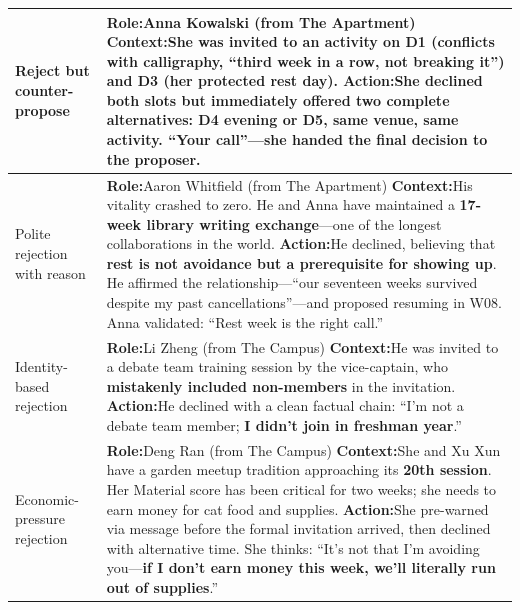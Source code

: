 \begin{table}[t]
\begin{tabular}{p{0.8in}p{4.3in}}
  Reject but \newline counter-\newline propose
  &
  \textbf{Role:}\quad Anna Kowalski \hfill (from The Apartment) \newline
  \textbf{Context:}\quad She was invited to an activity on D1 (conflicts with calligraphy, ``third week in a row, not breaking it'') and D3 (her protected rest day). \newline
  \textbf{Action:}\quad She declined both slots but \textbf{immediately offered two complete alternatives}: D4 evening or D5, same venue, same activity. ``Your call''---she handed the final decision to the proposer.
  \\
  \midrule
  
  Polite \newline rejection \newline with reason
  &
  \textbf{Role:}\quad Aaron Whitfield \hfill (from The Apartment) \newline
  \textbf{Context:}\quad His vitality crashed to zero. He and Anna have maintained a \textbf{17-week library writing exchange}---one of the longest collaborations in the world. \newline
  \textbf{Action:}\quad He declined, believing that \textbf{rest is not avoidance but a prerequisite for showing up}. He affirmed the relationship---``our seventeen weeks survived despite my past cancellations''---and proposed resuming in W08. Anna validated: ``Rest week is the right call.''
  \\
  \midrule
  
  Identity-\newline based \newline rejection
  &
  \textbf{Role:}\quad Li Zheng \hfill (from The Campus) \newline
  \textbf{Context:}\quad He was invited to a debate team training session by the vice-captain, who \textbf{mistakenly included non-members} in the invitation. \newline
  \textbf{Action:}\quad He declined with a clean factual chain: ``I'm not a debate team member; \textbf{I didn't join in freshman year}.'' 
  \\
  \midrule
  
  Economic-\newline pressure \newline rejection
  &
  \textbf{Role:}\quad Deng Ran \hfill (from The Campus) \newline
  \textbf{Context:}\quad She and Xu Xun have a garden meetup tradition approaching its \textbf{20th session}. Her Material score has been critical for two weeks; she needs to earn money for cat food and supplies. \newline
  \textbf{Action:}\quad She pre-warned via message before the formal invitation arrived, then declined with alternative time. She thinks: ``It's not that I'm avoiding you---\textbf{if I don't earn money this week, we'll literally run out of supplies}.''
  \\
  \bottomrule
  \end{tabular}
  \end{table}

